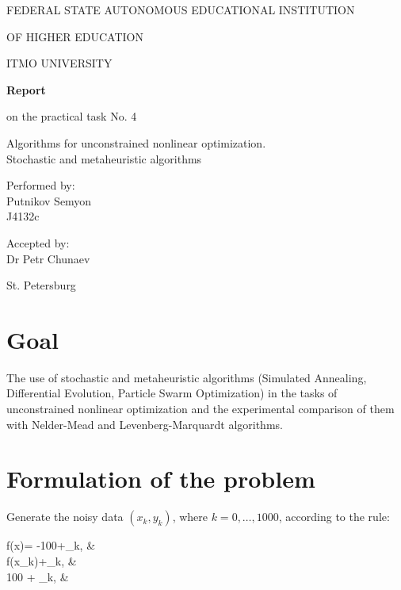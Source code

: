 \documentclass[a4paper,article,14pt]{extarticle}
\begin{document}
	\begin{titlepage}
		\begin{center}
			FEDERAL STATE AUTONOMOUS EDUCATIONAL INSTITUTION
			
			OF HIGHER EDUCATION
			
			ITMO UNIVERSITY
			\vspace{3cm}
			
			\large\textbf{Report}
			
			\large on the practical task No. 4
			
			\large \flqq Algorithms for unconstrained nonlinear optimization. \\ Stochastic and metaheuristic algorithms\frqq
			\vspace{5cm}
			

			\begin{flushright}
				{Performed by:} \\
				Putnikov Semyon \\ 
				J4132c \\
			\end{flushright}
			
			
			\begin{flushright}
				{Accepted by:} \\
				Dr Petr Chunaev \\ 
			\end{flushright}
			\vfill
			
			{St. Petersburg}
			\par{\number\year}
		\end{center}
	\end{titlepage}

	\newpage
	
	\section{Goal}
	The use of stochastic and metaheuristic algorithms (Simulated Annealing, Differential Evolution, Particle Swarm Optimization) in the tasks of unconstrained nonlinear optimization and the experimental comparison of them with Nelder-Mead and Levenberg-Marquardt algorithms.
	
	\section{Formulation of the problem}
	Generate the noisy data $(x_k,y_k)$, where $k=0,…,1000$, according to the rule:
	\begin{numcases}{f(x)=}
		-100+\delta_k, & \\
		f(x_k)+\delta_k, & \\
		100 + \delta_k, & 
	\end{numcases}
	
\end{document}
